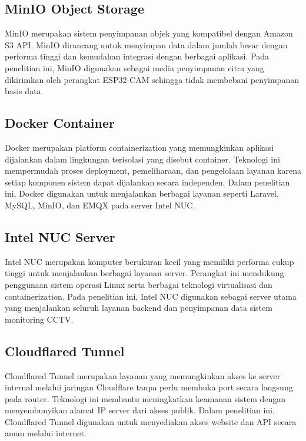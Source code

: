 \subsection{MinIO Object Storage}

MinIO merupakan sistem penyimpanan objek yang kompatibel dengan Amazon S3 API. MinIO dirancang untuk menyimpan data dalam jumlah besar dengan performa tinggi dan kemudahan integrasi dengan berbagai aplikasi. Pada penelitian ini, MinIO digunakan sebagai media penyimpanan citra yang dikirimkan oleh perangkat ESP32-CAM sehingga tidak membebani penyimpanan basis data.

\subsection{Docker Container}

Docker merupakan platform containerization yang memungkinkan aplikasi dijalankan dalam lingkungan terisolasi yang disebut container. Teknologi ini mempermudah proses deployment, pemeliharaan, dan pengelolaan layanan karena setiap komponen sistem dapat dijalankan secara independen. Dalam penelitian ini, Docker digunakan untuk menjalankan berbagai layanan seperti Laravel, MySQL, MinIO, dan EMQX pada server Intel NUC.

\subsection{Intel NUC Server}

Intel NUC merupakan komputer berukuran kecil yang memiliki performa cukup tinggi untuk menjalankan berbagai layanan server. Perangkat ini mendukung penggunaan sistem operasi Linux serta berbagai teknologi virtualisasi dan containerization. Pada penelitian ini, Intel NUC digunakan sebagai server utama yang menjalankan seluruh layanan backend dan penyimpanan data sistem monitoring CCTV.

\subsection{Cloudflared Tunnel}

Cloudflared Tunnel merupakan layanan yang memungkinkan akses ke server internal melalui jaringan Cloudflare tanpa perlu membuka port secara langsung pada router. Teknologi ini membantu meningkatkan keamanan sistem dengan menyembunyikan alamat IP server dari akses publik. Dalam penelitian ini, Cloudflared Tunnel digunakan untuk menyediakan akses website dan API secara aman melalui internet.

